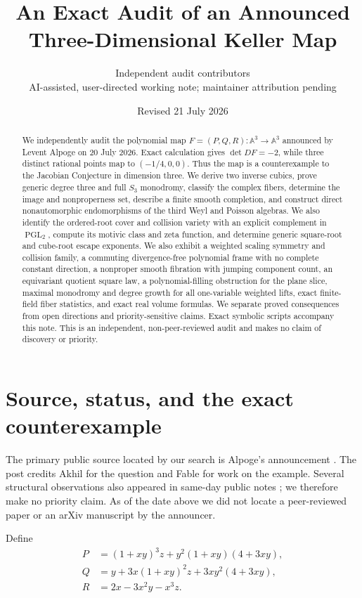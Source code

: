 \documentclass[11pt]{article}
\title{An Exact Audit of an Announced\\Three-Dimensional Keller Map}
\author{Independent audit contributors\\
\small AI-assisted, user-directed working note; maintainer attribution pending}
\date{Revised 21 July 2026}
\theoremstyle{remark}
\newcommand{\A}{\mathbb A}
\begin{document}
\maketitle

\begin{abstract}
We independently audit the polynomial map $F=(P,Q,R):\A^3\to\A^3$
announced by Levent Alpoge on 20 July 2026. Exact calculation gives
$\det DF=-2$, while three distinct rational points map to $(-1/4,0,0)$.
Thus the map is a counterexample to the Jacobian Conjecture in dimension
three. We derive two inverse cubics, prove generic degree three and full
$S_3$ monodromy, classify the complex fibers, determine the image and
nonproperness set, describe a finite smooth completion, and construct direct
nonautomorphic endomorphisms of the third Weyl and Poisson algebras. We also
identify the ordered-root cover and collision variety with an explicit
complement in $\operatorname{PGL}_2$, compute its motivic class and zeta
function, and determine generic square-root and cube-root escape exponents.
We also
exhibit a weighted scaling symmetry and collision family, a commuting
divergence-free polynomial frame with no complete constant direction, a
nonproper smooth fibration with jumping component count, an equivariant
quotient square law, a polynomial-filling obstruction for the plane slice,
maximal monodromy and degree growth for all one-variable weighted lifts, exact
finite-field fiber statistics, and exact real volume
formulas. We separate proved consequences from open directions and
priority-sensitive claims. Exact symbolic scripts accompany this note. This is
an independent, non-peer-reviewed audit and makes no claim of discovery or
priority.
\end{abstract}

\section{Source, status, and the exact counterexample}

The primary public source located by our search is Alpoge's announcement
\cite{alpoge}. The post credits Akhil for the question and Fable for work on
the example. Several structural observations also appeared in same-day public
notes \cite{gallagher,mo,zhang}; we therefore make no priority claim. As of the
date above we did not locate a peer-reviewed paper or an arXiv manuscript by
the announcer.

Define
\begin{align*}
P&=(1+xy)^3z+y^2(1+xy)(4+3xy),\\
Q&=y+3x(1+xy)^2z+3xy^2(4+3xy),\\
R&=2x-3x^2y-x^3z.
\end{align*}
\end{document}
